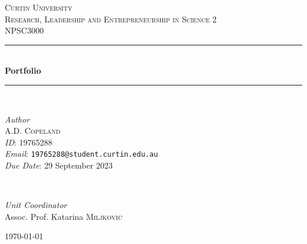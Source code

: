 \documentclass[11pt]{article}
\begin{document}
\begin{titlepage} 
\newcommand{\HRule}{\rule{\linewidth}{0.5mm}} 
	
	\center %

	
	\textsc{\LARGE Curtin University}\\[1.5cm] %
	
	\textsc{\Large Research, Leadership and Entrepreneurship in Science 2}\\[0.5cm] %
	
	\textsc{\large NPSC3000}\\[0.5cm] %
	
	\HRule\\[0.4cm]
	
	{\huge\bfseries Portfolio}\\[0.4cm] %
	
	\HRule\\[1.5cm]
	
	\begin{minipage}{0.5\textwidth}
		\begin{flushleft}
			\large
			\textit{Author}\\
			A.D. \textsc{Copeland}\\
                        \textit{ID}: 19765288\\
                        \textit{Email}: \texttt{19765288@student.curtin.edu.au}\\
                        \textit{Due Date}: 29 September 2023
		\end{flushleft}
	\end{minipage}
	~
	\begin{minipage}{0.4\textwidth}
		\begin{flushright}
			\large
			\textit{Unit Coordinator}\\
			Assoc. Prof. Katarina \textsc{Miljkovic}\\ %
		\end{flushright}
	\end{minipage}
	
	

	\vfill\vfill %

    \raggedright
    
	\large\today %
	
\end{titlepage}
\end{document}
